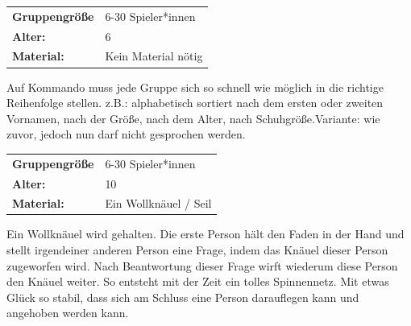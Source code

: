 \begin{table}[H]
\begin{tabular}{>{\bfseries}lp{8cm}}
   Gruppengröße   & 6-30 Spieler*innen\\
    Alter: & 6 \\
    Material: & Kein Material nötig\\
\end{tabular}
\end{table} 
 Auf Kommando muss jede Gruppe sich so schnell wie möglich in die richtige Reihenfolge stellen. z.B.: alphabetisch sortiert nach dem ersten oder zweiten Vornamen, nach der Größe, nach dem Alter, nach Schuhgröße.Variante: wie  zuvor,  jedoch  nun  darf  nicht  gesprochen werden.\\



\begin{table}[H]
\begin{tabular}{>{\bfseries}lp{8cm}}
   Gruppengröße   & 6-30 Spieler*innen\\
    Alter: & 10 \\
    Material: & Ein Wollknäuel / Seil \\
\end{tabular}
\end{table} 
 Ein Wollknäuel wird gehalten. Die erste Person hält den Faden in der Hand und stellt irgendeiner anderen Person eine Frage, indem das Knäuel dieser Person zugeworfen wird. Nach Beantwortung dieser Frage wirft wiederum diese Person den Knäuel weiter. So entsteht mit der Zeit ein tolles Spinnennetz. Mit etwas Glück so stabil, dass sich am Schluss eine Person darauflegen kann und angehoben werden kann.
 \\


